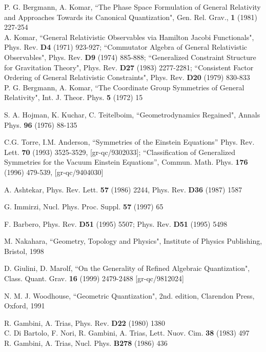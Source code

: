\documentclass[12pt]{report}
\begin{document}
\begin{thebibliography}{99}
P. G. Bergmann, A. Komar, ``The Phase Space Formulation of General 
Relativity and Approaches Towards its Canonical Quantization", 
Gen. Rel. Grav., {\bf 1}  (1981) 227-254\\
A. Komar, ``General Relativistic Observables via Hamilton Jacobi 
Functionals", Phys. Rev. {\bf D4} (1971) 923-927;
``Commutator Algebra of General Relativistic 
Observables", Phys. Rev. {\bf D9} (1974) 885-888;
``Generalized Constraint Structure for Gravitation Theory",
Phys. Rev. {\bf D27} (1983) 2277-2281;
``Consistent Factor Ordering of General Relativistic Constraints",
Phys. Rev. {\bf D20} (1979) 830-833\\
P. G. Bergmann, A. Komar, ``The Coordinate Group Symmetries of General 
Relativity", Int. J. Theor. Phys. {\bf 5} (1972) 15

S. A. Hojman, K. Kuchar, C. Teitelboim, ``Geometrodynamics Regained",
Annals Phys. {\bf 96} (1976) 88-135

C.G. Torre, I.M. Anderson, ``Symmetries of the Einstein Equations''
Phys. Rev. Lett. {\bf 70} (1993) 3525-3529, [gr-qc/9302033];
``Classification of Generalized Symmetries for the Vacuum Einstein 
Equations'', Commun. Math. Phys. {\bf 176} (1996) 479-539,
[gr-qc/9404030]

 A. Ashtekar, Phys. Rev. Lett. {\bf 57} (1986) 2244,
            Phys. Rev. {\bf D36} (1987) 1587

 G. Immirzi, 
Nucl. Phys. Proc. Suppl. {\bf 57} (1997) 65

 F. Barbero, Phys. Rev. {\bf D51} (1995) 5507;
Phys. Rev. {\bf D51} (1995) 5498

M. Nakahara, ``Geometry, Topology and Physics",
Institute of Physics Publishing, Bristol, 1998

 D. Giulini, D. Marolf, ``On the Generality of Refined Algebraic
Quantization", Class. Quant. Grav. {\bf 16} (1999) 2479-2488 
[gr-qc/9812024]

 N. M. J. Woodhouse, ``Geometric Quantization", 2nd. edition,
Clarendon Press, Oxford, 1991

 R. Gambini, A. Trias, Phys. Rev. {\bf D22} (1980) 1380\\  
C. Di Bartolo, F. Nori, R. Gambini, A. Trias, Lett. Nuov. Cim.
{\bf 38} (1983) 497\\
R. Gambini, A. Trias, Nucl. Phys. {\bf B278} (1986) 436


\end{thebibliography}
\end{document}
